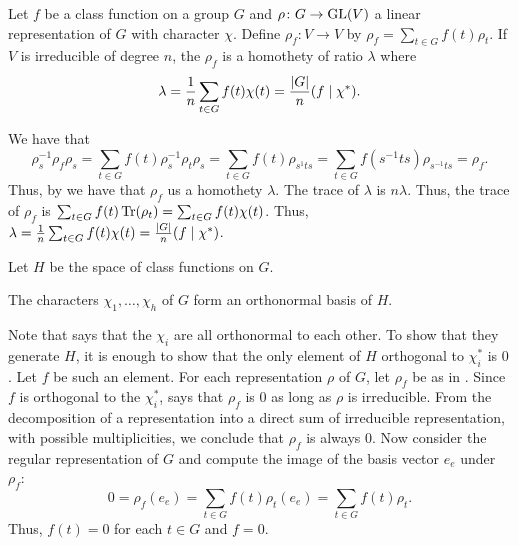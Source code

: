 \documentclass[letterpaper, 11pt, oneside]{book}
\begin{document}
\begin{prop}\label{prop:rho_f_homothety}
  Let $f$ be a class function on a group $G$ and $\rho\colon G \to \operatorname{GL}(V)$ a linear representation of $G$ with character $\chi$.
  Define $\rho_{f}\colon V \to V$ by $\rho_{f} = \sum_{t \in G} f(t) \rho_{t}$.
  If $V$ is irreducible of degree $n$, the $\rho_{f}$ is a homothety of ratio $\lambda$ where
  \[
    \lambda = \frac{1}{n} \sum_{t \in G} f(t) \chi(t) = \frac{\abs{G}}{n} (f \mid \chi^{*}).
  \]
\end{prop}
\begin{pf}
  We have that
  \[
    \rho_{s}^{-1} \rho_{f} \rho_{s} = \sum_{t \in G} f(t) \rho_{s}^{-1} \rho_{t} \rho_{s} = \sum_{t \in G} f(t) \rho_{s^{1} t s} = \sum_{t \in G} f(s^{-1}ts)\rho_{s^{-1}ts} = \rho_{f}.
  \]
  Thus, by  we have that $\rho_{f}$ us a homothety $\lambda$.
  The trace of $\lambda$ is $n \lambda$.
  Thus, the trace of $\rho_{f}$ is $\sum_{t \in G} f(t) \Tr(\rho_{t}) = \sum_{t \in G} f(t) \chi(t)$.
  Thus, $\lambda = \frac{1}{n} \sum_{t \in G} f(t) \chi(t) = \frac{\abs{G}}{n} (f \mid \chi^{*})$.
\end{pf}

\clearpage

Let $H$ be the space of class functions on $G$.

\begin{thrm}\label{thrm:characters_basis_class_funcs}
  The characters $\chi_{1}, \ldots, \chi_{h}$ of $G$ form an orthonormal basis of $H$.
\end{thrm}
\begin{pf}
  Note that  says that the $\chi_{i}$ are all orthonormal to each other.
  To show that they generate $H$, it is enough to show that the only element of $H$ orthogonal to $\chi_{i}^{*}$ is $0$.
  Let $f$ be such an element.
  For each representation $\rho$ of $G$, let $\rho_{f}$ be as in .
  Since $f$ is orthogonal to the $\chi_{i}^{*}$,  says that $\rho_{f}$ is $0$ as long as $\rho$ is irreducible.
  From the decomposition of a representation into a direct sum of irreducible representation, with possible multiplicities, we conclude that $\rho_{f}$ is always $0$.
  Now consider the regular representation of $G$ and compute the image of the basis vector $e_{e}$ under $\rho_{f}$:
  \[
    0 = \rho_{f}(e_{e}) = \sum_{t \in G} f(t) \rho_{t}(e_{e}) = \sum_{t \in G} f(t)\rho_{t}.
  \]
  Thus, $f(t) = 0$ for each $t \in G$ and $f = 0$.
\end{pf}
\end{document}
